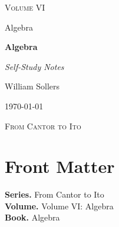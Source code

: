 \documentclass[12pt, a4paper]{report}
\begin{document}
\ExplSyntaxOff
\renewcommand{\familydefault}{\rmdefault}

\begin{titlepage}
\centering
\vspace*{3.5cm}

{\Large\scshape Volume VI\par}
\vspace{0.35cm}
{\large Algebra\par}

\vspace{1.4cm}

{\Huge\bfseries Algebra\par}

\vspace{0.6cm}
{\large\itshape Self-Study Notes\par}

\vfill

{\large William Sollers\par}
\vspace{0.35cm}
{\large \today\par}

\vfill

{\large\scshape From Cantor to Ito\par}
\end{titlepage}

\clearpage
\thispagestyle{plain}
\chapter*{Front Matter}
\noindent\textbf{Series.} From Cantor to Ito\\[0.5em]
\textbf{Volume.} Volume VI: Algebra\\[0.5em]
\textbf{Book.} Algebra

\clearpage
\tableofcontents
\clearpage
{}



\clearpage



\printindex[tech]
\printindex[dep]
\end{document}
